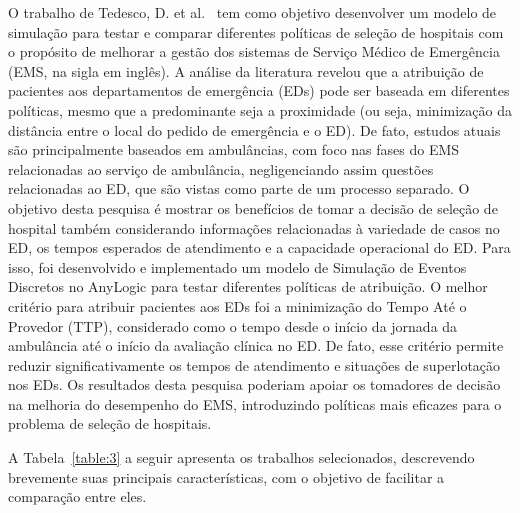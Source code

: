 O trabalho de Tedesco, D. et al.~\cite{10.1145/3587889.3587893} tem como objetivo desenvolver um modelo de simulação para testar e comparar diferentes políticas de seleção de hospitais com o propósito de melhorar a gestão dos sistemas de Serviço Médico de Emergência (EMS, na sigla em inglês). A análise da literatura revelou que a atribuição de pacientes aos departamentos de emergência (EDs) pode ser baseada em diferentes políticas, mesmo que a predominante seja a proximidade (ou seja, minimização da distância entre o local do pedido de emergência e o ED). De fato, estudos atuais são principalmente baseados em ambulâncias, com foco nas fases do EMS relacionadas ao serviço de ambulância, negligenciando assim questões relacionadas ao ED, que são vistas como parte de um processo separado. O objetivo desta pesquisa é mostrar os benefícios de tomar a decisão de seleção de hospital também considerando informações relacionadas à variedade de casos no ED, os tempos esperados de atendimento e a capacidade operacional do ED. Para isso, foi desenvolvido e implementado um modelo de Simulação de Eventos Discretos no AnyLogic para testar diferentes políticas de atribuição. O melhor critério para atribuir pacientes aos EDs foi a minimização do Tempo Até o Provedor (TTP), considerado como o tempo desde o início da jornada da ambulância até o início da avaliação clínica no ED. De fato, esse critério permite reduzir significativamente os tempos de atendimento e situações de superlotação nos EDs. Os resultados desta pesquisa poderiam apoiar os tomadores de decisão na melhoria do desempenho do EMS, introduzindo políticas mais eficazes para o problema de seleção de hospitais.

A Tabela~\ref{table:3} a seguir apresenta os trabalhos selecionados, descrevendo brevemente suas principais características, com o objetivo de facilitar a comparação entre eles.

